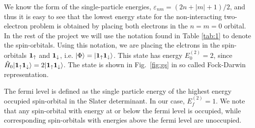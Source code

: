 \documentclass[a4paper]{article}
\newcommand{\fig}[1]{Fig.\ \ref{fig:#1}}
\newcommand{\tab}[1]{Table \ref{tab:#1}}
\renewcommand{\u}[1]{{\bf #1}_\uparrow}
\renewcommand{\d}[1]{{\bf #1}_\downarrow}
\begin{document}
We know the form of the single-particle energies, $\varepsilon_{n m}=(2n+|m|+1)/2$, and thus it is easy to see that the lowest energy state for the non-interacting two-electron problem is obtained by placing both electrons in the $n=m=0$ orbital. In the rest of the project we will use the notation found in \tab{1} to denote the spin-orbitals. Using this notation, we are placing the elctrons in the spin-orbitals $\u{1}$ and $\d{1}$, i.e. $|\Phi\rangle = |\u{1}\d{1}\rangle$. This state has energy $E_0^{(2)}=2$, since $\hat{H}_0|\u{1}\d{1}\rangle=2|\u{1}\d{1}\rangle$. The state is shown in \fig{gs} in so called Fock-Darwin representation.

The fermi level is defined as the single particle energy of the highest energy occupied spin-orbital in the Slater determinant. In our case, $E^{(2)}_f=1$. We note that any spin-orbital with energy at or below the fermi level is occupied, while corresponding spin-orbitals with energies above the fermi level are unoccupied.
\end{document}
